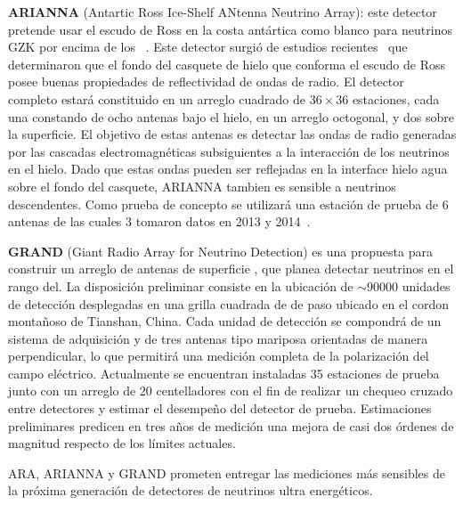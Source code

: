 	\textbf{ARIANNA} (Antartic Ross Ice-Shelf ANtenna Neutrino Array): este detector pretende usar el escudo de Ross en la costa ant\'artica como blanco para neutrinos GZK por encima de los ~\cite{cite:ARIANNA}.
	Este detector surgi\'o de estudios recientes~\cite{cite:ARIANNA2} que determinaron que el fondo del casquete de hielo que conforma el escudo de Ross posee buenas propiedades de reflectividad de ondas de radio.
	El detector completo estar\'a constituido en un arreglo cuadrado de $36\times36$ estaciones, cada una constando de ocho antenas bajo el hielo, en un arreglo octogonal, y dos sobre la superficie.
	El objetivo de estas antenas es detectar las ondas de radio generadas por las cascadas electromagn\'eticas subsiguientes a la interacci\'on de los neutrinos en el hielo. Dado que estas ondas pueden ser reflejadas en la interface hielo agua sobre el fondo del casquete, ARIANNA tambien es sensible a neutrinos descendentes.
	Como prueba de concepto se utilizar\'a una estaci\'on de prueba de 6 antenas de las cuales 3 tomaron datos en 2013 y 2014~\cite{cite:ARIANNA3}.
	
	\textbf{GRAND} (Giant Radio Array for Neutrino Detection) es una propuesta para construir un arreglo de antenas de superficie , que planea detectar neutrinos en el rango del. 
	La disposici\'on preliminar consiste en la ubicaci\'on de $\sim90000$ unidades de detecci\'on desplegadas en una grilla cuadrada de  de paso ubicado en el cordon monta\~noso de Tianshan, China.
	Cada unidad de detecci\'on se compondr\'a de un sistema de adquisici\'on y de tres antenas tipo mariposa orientadas de manera perpendicular, lo que permitir\'a una medici\'on completa de la polarizaci\'on del campo el\'ectrico. 
	Actualmente se encuentran instaladas 35 estaciones de prueba junto con un arreglo de 20 centelladores con el fin de realizar un chequeo cruzado entre detectores y estimar el desempe\~no del detector de prueba.
	Estimaciones preliminares predicen en tres a\~nos de medici\'on una mejora de casi dos \'ordenes de magnitud respecto de los l\'imites actuales.
	
	ARA, ARIANNA y GRAND prometen entregar las mediciones m\'as sensibles de la pr\'oxima generaci\'on de detectores de neutrinos ultra energ\'eticos.


